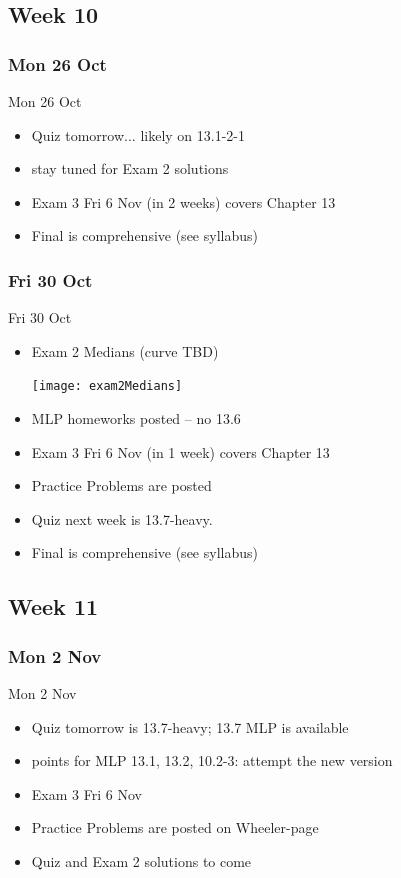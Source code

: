 \documentclass[12pt]{beamer}
\theoremstyle{plain}
\theoremstyle{definition}
\begin{document}
\subsection{Week 10}
\subsubsection{Mon 26 Oct}
\begin{frame}{Mon 26 Oct}%
\begin{itemize}
\item Quiz tomorrow... likely on 13.1-2-1
\item stay tuned for Exam 2 solutions
\item Exam 3 Fri 6 Nov (in 2 weeks) covers Chapter 13
\item Final is comprehensive (see syllabus)
\end{itemize}
\end{frame}

\subsubsection{Fri 30 Oct}
\begin{frame}{Fri 30 Oct}%
\begin{itemize}
\item Exam 2 Medians (curve TBD)
	\begin{center}
	\texttt{[image: exam2Medians]}
	\end{center}
\item MLP homeworks posted -- no 13.6
\item Exam 3 Fri 6 Nov (in 1 week) covers Chapter 13
\item Practice Problems are posted
\item Quiz next week is 13.7-heavy.
\item Final is comprehensive (see syllabus)
\end{itemize}
\end{frame}

\subsection{Week 11}
\subsubsection{Mon 2 Nov}
\begin{frame}{Mon 2 Nov}%
\begin{itemize}
\item Quiz tomorrow is 13.7-heavy; 13.7 MLP is available
\item points for MLP 13.1, 13.2, 10.2-3: attempt the new version 
\item Exam 3 Fri 6 Nov
\item Practice Problems are posted on Wheeler-page
\item Quiz and Exam 2 solutions to come
\end{itemize}
\end{frame}
\end{document}
